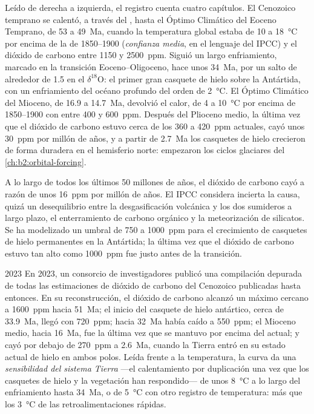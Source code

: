 Leído de derecha a izquierda, el registro cuenta cuatro capítulos. El Cenozoico temprano se calentó, a través del
, hasta el Óptimo Climático del Eoceno Temprano, de 53 a \qty{49}{Ma}, cuando
la temperatura global estaba de 10 a \qty{18}{\celsius} por encima de la de 1850--1900 (\emph{confianza
media}, en el lenguaje del IPCC) y el dióxido de carbono entre 1150 y \qty{2500}{ppm}.
Siguió un largo enfriamiento, marcado en la transición Eoceno--Oligoceno, hace unos \qty{34}{Ma}, por un
salto de alrededor de \qty{1.5}{\permil} en el $\delta^{18}$O: el primer gran casquete de hielo sobre la Antártida, con un
enfriamiento del océano profundo del orden de \qty{2}{\celsius}. El Óptimo Climático del Mioceno, de 16.9 a
\qty{14.7}{Ma}, devolvió el calor, de 4 a \qty{10}{\celsius} por encima de 1850--1900 con entre 400 y
\qty{600}{ppm}. Después del Plioceno medio, la última vez que el dióxido de carbono estuvo cerca de los 360 a
\qty{420}{ppm} actuales, cayó unos \qty{30}{ppm} por millón de años, y a partir de \qty{2.7}{Ma} los casquetes de hielo
crecieron de forma duradera en el hemisferio norte: empezaron los ciclos glaciares del \cref{ch:b2:orbital-forcing}.

A lo largo de todos los últimos 50 millones de años, el dióxido de carbono cayó a razón de unos \qty{16}{ppm} por millón
de años. El IPCC considera incierta la causa, quizá un desequilibrio entre la desgasificación volcánica y los
dos sumideros a largo plazo, el enterramiento de carbono orgánico y la meteorización de silicatos. Se ha modelizado un umbral de 750 a
\qty{1000}{ppm} para el crecimiento de casquetes de hielo permanentes en la Antártida; la última vez que el
dióxido de carbono estuvo tan alto como \qty{1000}{ppm} fue justo antes de la transición.

\begin{dated}{2023}
En 2023, un consorcio de investigadores publicó una compilación depurada de todas las estimaciones de dióxido de carbono
del Cenozoico publicadas hasta entonces. En su reconstrucción, el dióxido de carbono alcanzó un máximo cercano a \qty{1600}{ppm} hacia
\qty{51}{Ma}; el inicio del casquete de hielo antártico, cerca de \qty{33.9}{Ma}, llegó con \qty{720}{ppm}; hacia
\qty{32}{Ma} había caído a \qty{550}{ppm}; el Mioceno medio, hacia \qty{16}{Ma}, fue la última
vez que se mantuvo por encima del actual; y cayó por debajo de \qty{270}{ppm} a \qty{2.6}{Ma}, cuando la Tierra
entró en su estado actual de hielo en ambos polos. Leída frente a la temperatura, la curva da una
\emph{sensibilidad del sistema Tierra} ---el calentamiento por duplicación una vez que los casquetes de hielo y la vegetación han
respondido--- de unos \qty{8}{\celsius} a lo largo del enfriamiento hasta \qty{34}{Ma}, o de \qty{5}{\celsius}
con otro registro de temperatura: más que los \qty{3}{\celsius} de las retroalimentaciones rápidas.
\end{dated}

